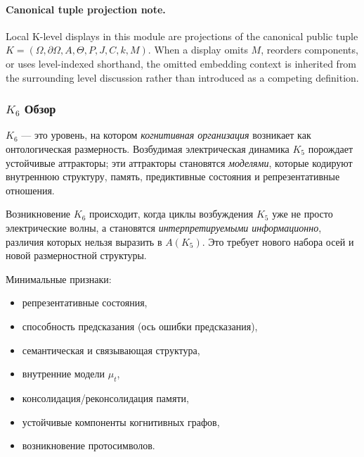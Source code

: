 



\paragraph{Canonical tuple projection note.}
Local K-level displays in this module are projections of the canonical public tuple \(K=(\Omega,\partial\Omega,A,\Theta,P,J,C,k,M)\). When a display omits \(M\), reorders components, or uses level-indexed shorthand, the omitted embedding context is inherited from the surrounding level discussion rather than introduced as a competing definition.

\subsubsection{\texorpdfstring{$K_6$}{K_6} Обзор}
\label{sec:k6-overview}

$K_6$ — это уровень, на котором \emph{когнитивная организация} возникает
как онтологическая размерность. Возбудимая электрическая динамика $K_5$
порождает устойчивые аттракторы; эти аттракторы становятся
\emph{моделями}, которые кодируют внутреннюю структуру, память,
предиктивные состояния и репрезентативные отношения.

Возникновение $K_6$ происходит, когда циклы возбуждения $K_5$ уже не
просто электрические волны, а становятся \emph{интерпретируемыми
информационно}, различия которых нельзя выразить в $A(K_5)$. Это
требует нового набора осей и новой размерностной структуры.

Минимальные признаки:
\begin{itemize}
    \item репрезентативные состояния,
    \item способность предсказания (ось ошибки предсказания),
    \item семантическая и связывающая структура,
    \item внутренние модели $\mu_t$,
    \item консолидация/реконсолидация памяти,
    \item устойчивые компоненты когнитивных графов,
    \item возникновение протосимволов.
\end{itemize}

